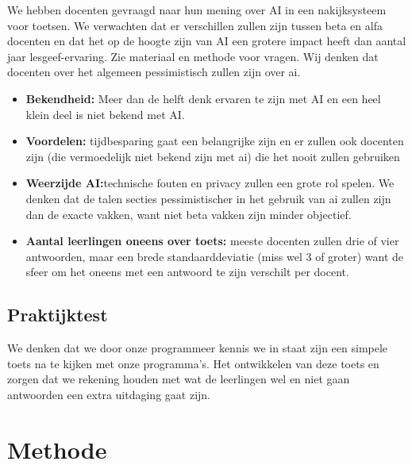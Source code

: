 \documentclass[12pt]{article}
\begin{document}
\begin{multicols}{2}
We hebben docenten gevraagd naar hun mening over AI in een nakijksysteem voor toetsen. We verwachten dat er verschillen zullen zijn tussen beta en alfa docenten en dat het op de hoogte zijn van AI een grotere impact heeft dan aantal jaar lesgeef-ervaring.
Zie materiaal en methode voor vragen.
Wij denken dat docenten over het algemeen pessimistisch zullen zijn over ai. \\
\begin{itemize}
\item \textbf{Bekendheid:} Meer dan de helft denk ervaren te zijn met AI en een heel klein deel is niet bekend met AI.
\item \textbf{Voordelen:} tijdbesparing gaat een belangrijke zijn en er zullen ook docenten zijn (die vermoedelijk niet bekend zijn met ai) die het nooit zullen gebruiken
\item \textbf{Weerzijde AI:}technische fouten en privacy zullen een grote rol spelen. We denken dat de talen secties pessimistischer in het gebruik van ai zullen zijn dan de exacte vakken, want niet beta vakken zijn minder objectief.
\item \textbf{Aantal leerlingen oneens over toets:} meeste docenten zullen drie of vier antwoorden, maar een brede standaarddeviatie (miss wel 3 of groter) want de sfeer om het oneens met een antwoord te zijn verschilt per docent.
\end{itemize}

\subsection{Praktijktest}
We denken dat we door onze programmeer kennis we in staat zijn een simpele toets na te kijken met onze programma's. Het ontwikkelen van deze toets en zorgen dat we rekening houden met wat de leerlingen wel en niet gaan antwoorden een extra uitdaging gaat zijn.
\end{multicols}
\pagebreak

\section{Methode}
\end{document}
